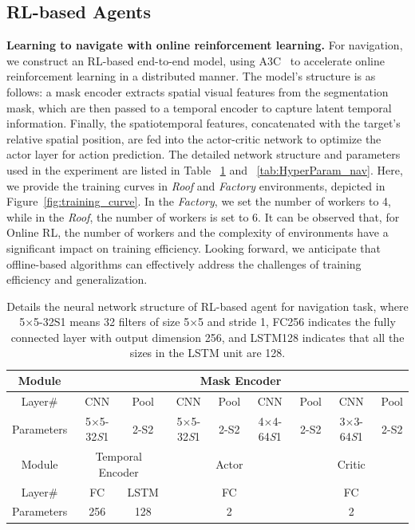 \subsection{RL-based Agents}
\label{app:onlineRL}
\textbf{Learning to navigate with online reinforcement learning.} For navigation, we construct an RL-based end-to-end model, using A3C~\citep{mnih2016asynchronous} to accelerate online reinforcement learning in a distributed manner. The model's structure is as follows: a mask encoder extracts spatial visual features from the segmentation mask, which are then passed to a temporal encoder to capture latent temporal information. Finally, the spatiotemporal features, concatenated with the target's relative spatial position, are fed into the actor-critic network to optimize the actor layer for action prediction. The detailed network structure and parameters used in the experiment are listed in Table ~\ref{RL-Based} and ~\ref{tab:HyperParam_nav}. Here, we provide the training curves in \textit{Roof} and \textit{Factory} environments, depicted in Figure~\ref{fig:training_curve}. In the \textit{Factory}, we set the number of workers to 4, while in the \textit{Roof}, the number of workers is set to 6. It can be observed that, for Online RL, the number of workers and the complexity of environments have a significant impact on training efficiency. Looking forward, we anticipate that offline-based algorithms can effectively address the challenges of training efficiency and generalization. 

\begin{table}[ht]
\centering
\caption{Details the neural network structure of RL-based agent for navigation task, where 5$\times$5-32S1 means 32 filters of size 5$\times$5 and stride 1, FC256 indicates the fully connected layer with output dimension 256, and LSTM128 indicates that all the sizes in the LSTM unit are 128.}
\begin{tabular}{c|c|c|c|c|c|c|c|c}
\hline\hline
Module & \multicolumn{8}{|c}{Mask Encoder}\\ \hline
Layer\# & CNN &Pool& CNN &Pool& CNN &Pool& CNN &Pool \\ \hline
Parameters &     5$\times$5-32\emph{S}1 &2-S2& 5$\times$5-32\emph{S}1 &2-S2& 4$\times$4-64\emph{S}1 &2-S2& 3$\times$3-64\emph{S}1 &2-S2  \\ \hline \hline
Module & \multicolumn{2}{|c|}{Temporal Encoder} &\multicolumn{3}{|c|}{ Actor} & \multicolumn{3}{|c}{Critic} \\ \hline
 Layer\# & FC& LSTM & \multicolumn{3}{c|}{FC}& \multicolumn{3}{c}{FC} \\ \hline
 Parameters &256 &128& \multicolumn{3}{c|}{2}&\multicolumn{3}{c}{2} \\ 

 \hline
\end{tabular}
\label{RL-Based}
\end{table}

